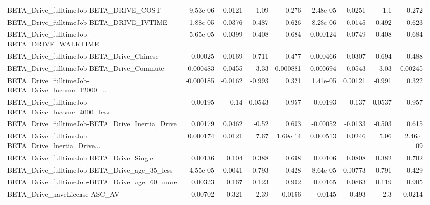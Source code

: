 \begin{tabular}{lrrrrrrrr}
BETA\_Drive\_fulltimeJob-BETA\_DRIVE\_COST             &    9.53e-06 &       0.0121 &     1.09 &    0.276 &   2.48e-05 &      0.0251 &          1.1 &         0.272 \\
BETA\_Drive\_fulltimeJob-BETA\_DRIVE\_IVTIME           &   -1.88e-05 &      -0.0376 &    0.487 &    0.626 &  -8.28e-06 &     -0.0145 &        0.492 &         0.623 \\
BETA\_Drive\_fulltimeJob-BETA\_DRIVE\_WALKTIME         &   -5.65e-05 &      -0.0399 &    0.408 &    0.684 &  -0.000124 &     -0.0749 &        0.408 &         0.684 \\
BETA\_Drive\_fulltimeJob-BETA\_Drive\_Chinese          &    -0.00025 &      -0.0169 &    0.711 &    0.477 &  -0.000466 &     -0.0307 &        0.694 &         0.488 \\
BETA\_Drive\_fulltimeJob-BETA\_Drive\_Commute          &    0.000483 &       0.0455 &    -3.33 & 0.000881 &   0.000694 &      0.0543 &        -3.03 &       0.00245 \\
BETA\_Drive\_fulltimeJob-BETA\_Drive\_Income\_12000\_... &   -0.000185 &      -0.0162 &   -0.993 &    0.321 &   1.41e-05 &     0.00121 &       -0.991 &         0.322 \\
BETA\_Drive\_fulltimeJob-BETA\_Drive\_Income\_4000\_less &     0.00195 &         0.14 &   0.0543 &    0.957 &    0.00193 &       0.137 &       0.0537 &         0.957 \\
BETA\_Drive\_fulltimeJob-BETA\_Drive\_Inertia\_Drive    &     0.00179 &       0.0462 &    -0.52 &    0.603 &   -0.00052 &     -0.0133 &       -0.503 &         0.615 \\
BETA\_Drive\_fulltimeJob-BETA\_Drive\_Inertia\_Drive... &   -0.000174 &      -0.0121 &    -7.67 & 1.69e-14 &   0.000513 &      0.0246 &        -5.96 &      2.46e-09 \\
BETA\_Drive\_fulltimeJob-BETA\_Drive\_Single           &     0.00136 &        0.104 &   -0.388 &    0.698 &    0.00106 &      0.0808 &       -0.382 &         0.702 \\
BETA\_Drive\_fulltimeJob-BETA\_Drive\_age\_35\_less      &    4.55e-05 &       0.0041 &   -0.793 &    0.428 &   8.64e-05 &     0.00773 &       -0.791 &         0.429 \\
BETA\_Drive\_fulltimeJob-BETA\_Drive\_age\_60\_more      &     0.00323 &        0.167 &    0.123 &    0.902 &    0.00165 &      0.0863 &        0.119 &         0.905 \\
BETA\_Drive\_haveLicense-ASC\_AV                      &     0.00702 &        0.321 &     2.39 &   0.0166 &     0.0145 &       0.493 &          2.3 &        0.0214 \\

\end{tabular}
